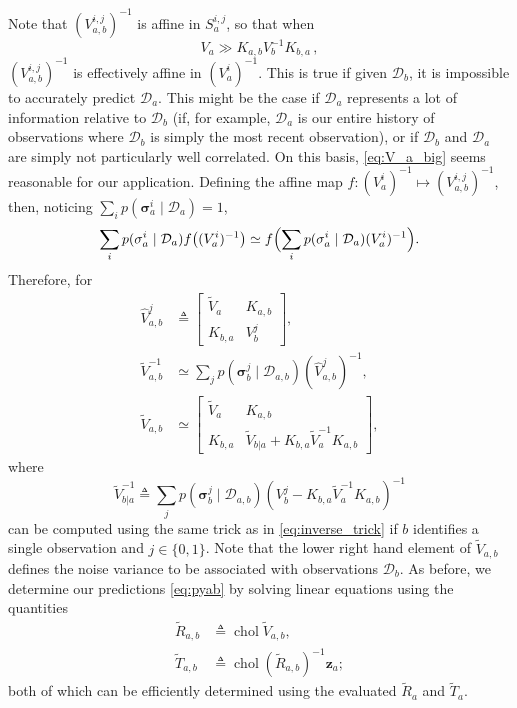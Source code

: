 \documentclass{article}
\newcommand{\given}{\ensuremath{\mid}}
\newcommand{\cm}[1]{\ensuremath{\mathcal{#1}}}
\newcommand{\bm}[1]{\ensuremath{\mathbf{#1}}}
\newcommand{\data}{\ensuremath{\cm{D}}}
\newcommand{\vect}[1]{\bm{#1}}
\newcommand{\vz}{\vect{z}}
\newcommand{\vs}{\vect{\sigma}}
\newcommand{\fPr}{p}
\newcommand{\Prob}[2]{\fPr(#1 \given #2 )}
\newcommand{\defequal}{\triangleq}
\DeclareMathOperator{\chol}{chol}
\begin{document}
Note that $({V}^{i,j}_{a,b})^{-1}$ is affine in $S^{i,j}_a$, so that when
\begin{equation}\label{eq:V_a_big}
 V_a \gg K_{a,b} V_b^{-1} K_{b,a}\,,
\end{equation}
$({V}^{i,j}_{a,b})^{-1}$ is effectively affine in $(V^i_a)^{-1}$. This
is true if given $\data_b$, it is impossible to accurately predict
$\data_a$. This might be the case if $\data_a$ represents a lot of
information relative to $\data_b$ (if, for example, $\data_a$ is our
entire history of observations where $\data_b$ is simply the most
recent observation), or if $\data_b$ and $\data_a$ are simply not
particularly well correlated. On this basis, \eqref{eq:V_a_big} seems
reasonable for our application. Defining the affine map $f\colon (V^i_a)^{-1}
\mapsto ({V}^{i,j}_{a,b})^{-1}$, then, noticing $\sum_i \Prob{\vs^i_{a}}{\data_{a}} = 1$,
$$
\sum_i \Prob{\vs^i_{a}}{\data_{a}} f\bigl((V^i_a)^{-1} \bigr) \simeq f\Bigl(\sum_i \Prob{\vs^i_{a}}{\data_{a}}(V^i_a)^{-1} \Bigr).
$$
Therefore, for
\begin{align*}
\hat{V}^{j}_{a,b} & \defequal
\begin{bmatrix}
 \tilde{V}_a & K_{a,b}
\\
 K_{b,a} & V^j_b
\end{bmatrix},
\\
\tilde{V}^{-1}_{a,b} &\simeq \sum_j \Prob{\vs^j_{b}}{\data_{a,b}} (\hat{V}^{j}_{a,b})^{-1},
\nonumber\\
\tilde{V}_{a,b} & \simeq
\begin{bmatrix}
 \tilde{V}_a & K_{a,b}\\
 K_{b,a} & \tilde{V}_{b|a} + K_{b,a} \tilde{V}_a^{-1} K_{a,b}
\end{bmatrix},
\end{align*}
where
\begin{equation*}
 \tilde{V}^{-1}_{b|a} \defequal \sum_j \Prob{\vs^j_{b}}{\data_{a,b}} (V^j_b -K_{b,a} \tilde{V}_a^{-1}K_{a,b})^{-1}
\end{equation*}
can be computed using the same trick as in \eqref{eq:inverse_trick} if
$b$ identifies a single observation and $j\in\{0,1\}$. Note that the
lower right hand element of $\tilde{V}_{a,b}$ defines the noise
variance to be associated with observations $\data_b$. As before, we
determine our predictions \eqref{eq:pyab} by solving linear equations
using the quantities
\begin{align}
 \tilde{R}_{a,b} & \defequal \chol \tilde{V}_{a,b} \label{eq:Rab}, \\
 \tilde{T}_{a,b} & \defequal \chol (\tilde{R}_{a,b})^{-1} \vz_a \label{eq:Tab};
\end{align}
both of which can be efficiently determined \citep[Appendix
  B]{osbornebayesian} using the evaluated $\tilde{R}_a$ and
$\tilde{T}_a$.
\end{document}
